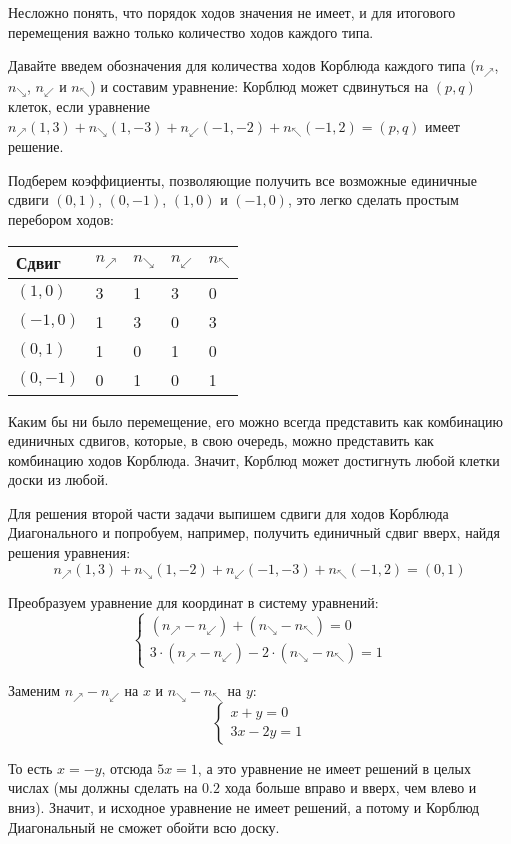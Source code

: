 \begin{itemize}
Несложно понять, что порядок ходов значения не имеет, и для итогового перемещения 
важно только количество ходов каждого типа.

Давайте введем обозначения для количества ходов Корблюда каждого типа 
($n_\nearrow$, $n_\searrow$, $n_\swarrow$ и $n_\nwarrow$) и
составим уравнение: Корблюд может
сдвинуться на $(p,q)$ клеток, если уравнение
$n_\nearrow(1,3) + n_\searrow(1,-3) + n_\swarrow(-1,-2) + n_\nwarrow(-1,2) = (p,q)$
имеет решение.

Подберем коэффициенты, позволяющие получить все возможные единичные сдвиги $(0,1)$,
$(0,-1)$, $(1,0)$ и $(-1,0)$, это легко сделать простым перебором ходов:

\begin{center}\begin{tabular}{lllll}
Сдвиг & $n_\nearrow$ & $n_\searrow$ & $n_\swarrow$ & $n_\nwarrow$ \\
\hline
$(1,0)$  & 3 & 1 & 3 & 0\\
$(-1,0)$ & 1 & 3 & 0 & 3\\
$(0,1)$  & 1 & 0 & 1 & 0\\
$(0,-1)$ & 0 & 1 & 0 & 1
\end{tabular}\end{center}

Каким бы ни было перемещение, его можно всегда представить как комбинацию единичных сдвигов,
которые, в свою очередь, можно представить как комбинацию ходов Корблюда. Значит, Корблюд может 
достигнуть любой клетки доски из любой.

Для решения второй части задачи выпишем сдвиги для ходов Корблюда Диагонального и попробуем,
например, получить единичный сдвиг вверх, найдя решения уравнения:
$$n_\nearrow(1,3) + n_\searrow(1,-2) + n_\swarrow(-1,-3) + n_\nwarrow(-1,2) = (0,1)$$

Преобразуем уравнение для координат в систему уравнений:
$$\left\{\begin{array}{l}
  (n_\nearrow - n_\swarrow) + (n_\searrow - n_\nwarrow) = 0\\
  3\cdot(n_\nearrow- n_\swarrow) - 2\cdot(n_\searrow-n_\nwarrow)=1
\end{array}\right.$$

Заменим $n_\nearrow- n_\swarrow$ на $x$ и $n_\searrow-n_\nwarrow$ на $y$:
$$\left\{\begin{array}{l}
  x + y = 0\\
  3x - 2y=1
\end{array}\right.$$

То есть $x = -y$, отсюда $5x = 1$, а это уравнение не имеет решений в целых числах
(мы должны сделать на $0.2$ хода больше вправо и вверх, чем влево и вниз).
Значит, и исходное уравнение не имеет решений, а потому и Корблюд Диагональный
не сможет обойти всю доску.


\end{itemize}
